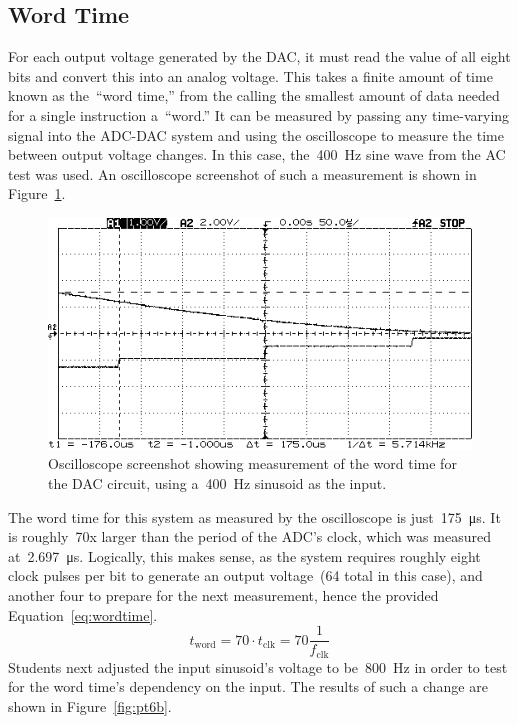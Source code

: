 \subsection{Word Time}
For each output voltage generated by the DAC, it must read the value of all eight bits and convert this into an analog voltage.  This takes a finite amount of time known as the~``word time,'' from the calling the smallest amount of data needed for a single instruction a~``word.''  It can be measured by passing any time-varying signal into the ADC-DAC system and using the oscilloscope to measure the time between output voltage changes.  In this case, the~\SI{400}{\hertz} sine wave from the AC test was used.  An oscilloscope screenshot of such a measurement is shown in Figure~\ref{fig:pt6a}.
%
\begin{figure}[H]
	\centering
	\includegraphics[width=.6\textwidth]{img/shot/pt6a_wordtime.png}
	\parbox{.6\textwidth}{
	\caption[Word Time Measurement --- \SI{400}{\hertz} Sinusoid]{Oscilloscope screenshot showing measurement of the word time for the DAC circuit, using a~\SI{400}{\hertz} sinusoid as the input.}
	\label{fig:pt6a}}
\end{figure}
%
The word time for this system as measured by the oscilloscope is just~\SI{175}{\micro\second}.  It is roughly~70x larger than the period of the ADC's clock, which was measured at~\SI{2.697}{\micro\second}.  Logically, this makes sense, as the system requires roughly eight clock pulses per bit to generate an output voltage~(64 total in this case), and another four to prepare for the next measurement, hence the provided Equation~\eqref{eq:wordtime}.
%
\begin{equation}
	t_\text{word} = 70 \cdot t_\text{clk} = 70 \frac{1}{f_\text{clk}} \label{eq:wordtime}
\end{equation}
%
Students next adjusted the input sinusoid's voltage to be~\SI{800}{\hertz} in order to test for the word time's dependency on the input.  The results of such a change are shown in Figure~\ref{fig:pt6b}.
%
